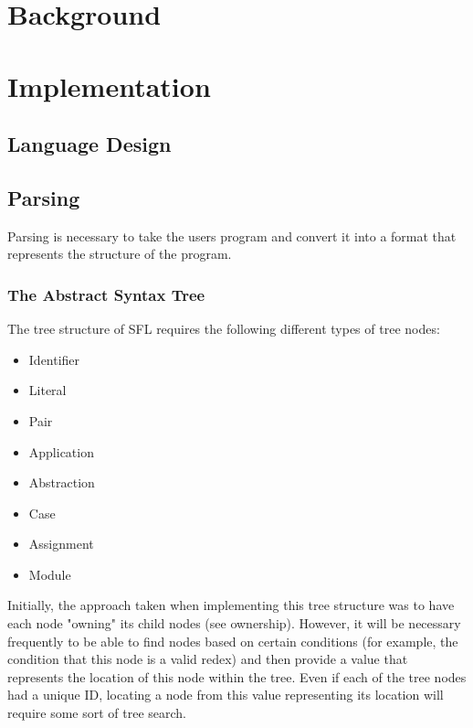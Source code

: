 \documentclass[
author={Kiran Sturt},
degree={BSc},
title={Implementing a Step by Step Evaluator for a Simple Functional Programming language},
unit={COMS30045},]{dissertation}
\begin{document}

\chapter{Background}
\label{chap:technical}



\chapter{Implementation}
\label{chap:execution}

\section{Language Design}

\section{Parsing}
Parsing is necessary to take the users program and convert it into a format that represents the structure of the program. 

\subsection{The Abstract Syntax Tree}
The tree structure of SFL requires the following different types of tree nodes:
\begin{itemize}
    \item Identifier
    \item Literal
    \item Pair
    \item Application
    \item Abstraction
    \item Case
    \item Assignment
    \item Module
\end{itemize}
Initially, the approach taken when implementing this tree structure was to have each node "owning" its child nodes (see ownership). However, it will be necessary frequently to be able to find nodes based on certain conditions (for example, the condition that this node is a valid redex) and then provide a value that represents the location of this node within the tree. Even if each of the tree nodes had a unique ID, locating a node from this value representing its location will require some sort of tree search.
\end{document}
